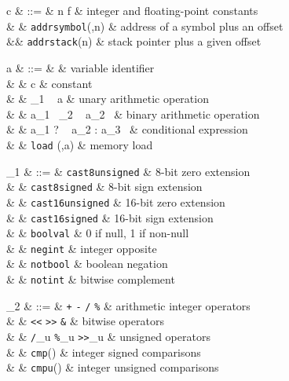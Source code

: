 \begin{figure}
\begin{syntaxleft}
 c & ::= & n \alt f & integer and floating-point constants\\
   & \alt & {\tt addrsymbol}(\id,n) &  address of a symbol plus an offset\\
   &\alt & {\tt addrstack}(n) & stack pointer plus a given offset

a & ::=  & \id & variable identifier\\
  & \alt & c & constant\\
  & \alt & \op_1 ~ a & unary arithmetic operation\\
  & \alt & a_1 ~\op_2 ~ a_2 \ & binary arithmetic operation\\
  & \alt & a_1 ? ~ a_2 : a_3 \ & conditional expression\\
  & \alt & {\tt load} (\chunk,a) & memory load 

\op_1 & ::= & {\tt cast8unsigned} & 8-bit zero extension \\
 & \alt & {\tt cast8signed} & 8-bit sign extension \\
          & \alt & {\tt cast16unsigned} & 16-bit zero extension \\
          & \alt & {\tt cast16signed} & 16-bit sign extension \\
          & \alt & {\tt boolval} & 0 if null, 1 if non-null \\
          & \alt & {\tt negint} & integer opposite \\
          & \alt & {\tt notbool} & boolean negation \\
          & \alt & {\tt notint} & bitwise complement 

\op_2 & ::=  & \hbox{{\tt +}} \alt \hbox{{\tt -}} \alt \hbox{{\tt *}} \alt \hbox{{\tt /}} \alt \hbox{{\tt \%}}
               & arithmetic integer operators \\ 
      & \alt & \hbox{{\tt <\/<}} \alt \hbox{{\tt >\/>}} \alt 
               \hbox{{\tt \&}} \alt \hbox{{\tt {}}} \alt \hbox{{\tt {}}}
               & bitwise operators\\
          & \alt & \hbox{{\tt /}}_u \alt \hbox{{\tt \%}}_u \alt \hbox{{\tt >\/>}}_u & unsigned operators \\
          & \alt & {\tt cmp}(\cmp)  & integer signed comparisons\\
          & \alt & {\tt cmpu}(\cmp) & integer unsigned comparisons


\end{syntaxleft}
\end{figure}
